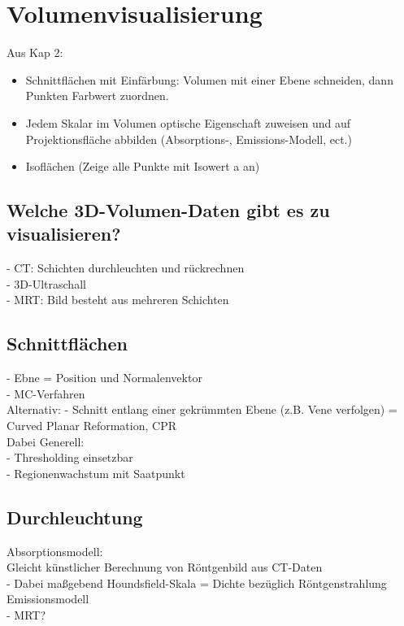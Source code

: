 \documentclass{article}
\begin{document}
\pagebreak
\section{Volumenvisualisierung}
Aus Kap 2:
\begin{itemize}[noitemsep]
	\item Schnittflächen mit Einfärbung: Volumen mit einer Ebene schneiden, dann Punkten Farbwert zuordnen.
	\item Jedem Skalar im Volumen optische Eigenschaft zuweisen und auf Projektionsfläche abbilden (Absorptions-, Emissions-Modell, ect.)
	\item Isoflächen (Zeige alle Punkte mit Isowert a an)
\end{itemize}


\subsection{Welche 3D-Volumen-Daten gibt es zu visualisieren?}
- CT: Schichten durchleuchten und rückrechnen\\
- 3D-Ultraschall\\
- MRT: Bild besteht aus mehreren Schichten

\subsection{Schnittflächen}
- Ebne = Position und Normalenvektor\\
- MC-Verfahren\\

\noindent Alternativ: 
- Schnitt entlang einer gekrümmten Ebene (z.B. Vene verfolgen) = Curved Planar Reformation, CPR\\

\noindent Dabei Generell:\\
- Thresholding einsetzbar\\
- Regionenwachstum mit Saatpunkt


\subsection{Durchleuchtung}
\noindent Absorptionsmodell:\\
Gleicht künstlicher Berechnung von Röntgenbild aus CT-Daten\\
- Dabei maßgebend Houndsfield-Skala = Dichte bezüglich Röntgenstrahlung\\

\noindent Emissionsmodell\\
- MRT?\\
\end{document}

